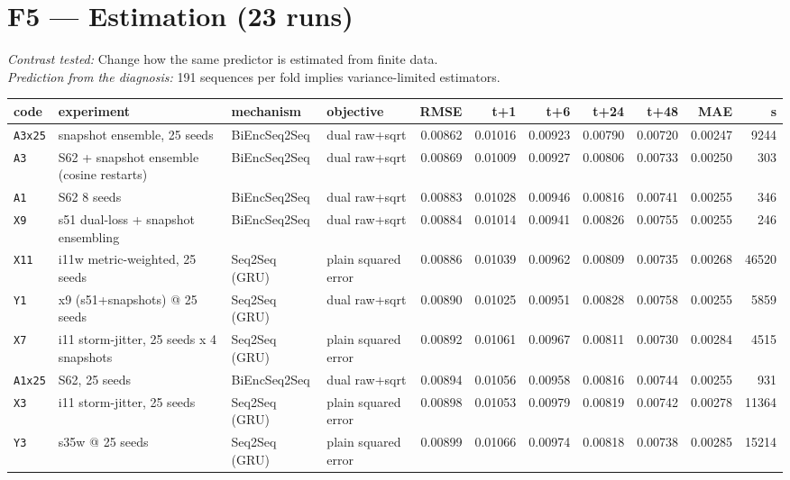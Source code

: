\documentclass[9pt,landscape]{article}
\begin{document}
\section*{F5 --- Estimation (23 runs)}
\noindent\emph{Contrast tested:} Change how the same predictor is estimated from finite data.\\
\emph{Prediction from the diagnosis:} 191 sequences per fold implies variance-limited estimators.
\vspace{2pt}
\begin{longtable}{@{}p{1.1cm}p{5.4cm}p{3.1cm}p{2.7cm}rrrrrrr@{}}
\toprule code & experiment & mechanism & objective & RMSE & t+1 & t+6 & t+24 & t+48 & MAE & s \\ \midrule \endhead
\rowcolor{gray!15}\texttt{A3x25} & snapshot ensemble, 25 seeds & BiEncSeq2Seq & dual raw+sqrt & 0.00862 & 0.01016 & 0.00923 & 0.00790 & 0.00720 & 0.00247 & 9244 \\
\texttt{A3} & S62 + snapshot ensemble (cosine restarts) & BiEncSeq2Seq & dual raw+sqrt & 0.00869 & 0.01009 & 0.00927 & 0.00806 & 0.00733 & 0.00250 & 303 \\
\texttt{A1} & S62 8 seeds & BiEncSeq2Seq & dual raw+sqrt & 0.00883 & 0.01028 & 0.00946 & 0.00816 & 0.00741 & 0.00255 & 346 \\
\rowcolor{gray!15}\texttt{X9} & s51 dual-loss + snapshot ensembling & BiEncSeq2Seq & dual raw+sqrt & 0.00884 & 0.01014 & 0.00941 & 0.00826 & 0.00755 & 0.00255 & 246 \\
\texttt{X11} & i11w metric-weighted, 25 seeds & Seq2Seq (GRU) & plain squared error & 0.00886 & 0.01039 & 0.00962 & 0.00809 & 0.00735 & 0.00268 & 46520 \\
\texttt{Y1} & x9 (s51+snapshots) @ 25 seeds & Seq2Seq (GRU) & dual raw+sqrt & 0.00890 & 0.01025 & 0.00951 & 0.00828 & 0.00758 & 0.00255 & 5859 \\
\texttt{X7} & i11 storm-jitter, 25 seeds x 4 snapshots & Seq2Seq (GRU) & plain squared error & 0.00892 & 0.01061 & 0.00967 & 0.00811 & 0.00730 & 0.00284 & 4515 \\
\texttt{A1x25} & S62, 25 seeds & BiEncSeq2Seq & dual raw+sqrt & 0.00894 & 0.01056 & 0.00958 & 0.00816 & 0.00744 & 0.00255 & 931 \\
\texttt{X3} & i11 storm-jitter, 25 seeds & Seq2Seq (GRU) & plain squared error & 0.00898 & 0.01053 & 0.00979 & 0.00819 & 0.00742 & 0.00278 & 11364 \\
\texttt{Y3} & s35w @ 25 seeds & Seq2Seq (GRU) & plain squared error & 0.00899 & 0.01066 & 0.00974 & 0.00818 & 0.00738 & 0.00285 & 15214 \\

\end{longtable}
\end{document}
